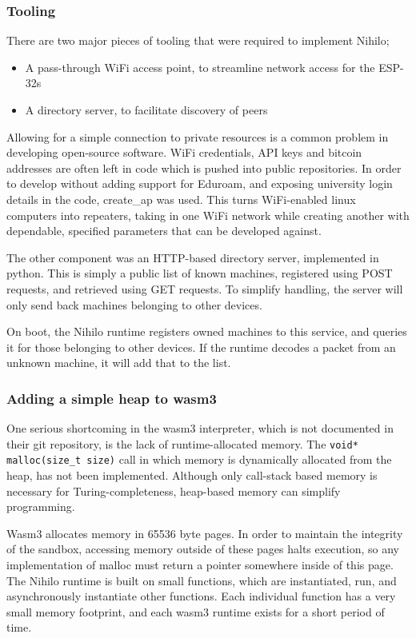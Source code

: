 \documentclass{article}
\begin{document}
\subsubsection{Tooling}

There are two major pieces of tooling that were required to implement Nihilo;
\begin{itemize}
\item A pass-through WiFi access point, to streamline network access for the ESP-32s
\item A directory server, to facilitate discovery of peers
\end{itemize}

Allowing for a simple connection to private resources is a common problem in developing open-source software. WiFi credentials, API keys and bitcoin addresses are often left in code which is pushed into public repositories. In order to develop without adding support for Eduroam, and exposing university login details in the code, create\_ap \cite{createap}  was used. This turns WiFi-enabled linux computers into repeaters, taking in one WiFi network while creating another with dependable, specified parameters that can be developed against.

The other component was an HTTP-based directory server, implemented in python. This is simply a public list of known machines, registered using POST requests, and retrieved using GET requests. To simplify handling, the server will only send back machines belonging to other devices. 

On boot, the Nihilo runtime registers owned machines to this service, and queries it for those belonging to other devices. If the runtime decodes a packet from an unknown machine, it will add that to the list.

\subsubsection{Adding a simple heap to wasm3}

One serious shortcoming in the wasm3 interpreter, which is not documented in their git repository, is the lack of runtime-allocated memory. The \texttt{void* malloc(size\_t size)} call in which memory is dynamically allocated from the heap, has not been implemented. Although only call-stack based memory is necessary for Turing-completeness, heap-based memory can simplify programming.

Wasm3 allocates memory in 65536 byte pages.
In order to maintain the integrity of the sandbox, accessing memory outside of these pages halts execution, so any implementation of malloc must return a pointer somewhere inside of this page. The Nihilo runtime is built on small functions, which are instantiated, run, and asynchronously instantiate other functions. Each individual function has a very small memory footprint, and each wasm3 runtime exists for a short period of time.
\end{document}
